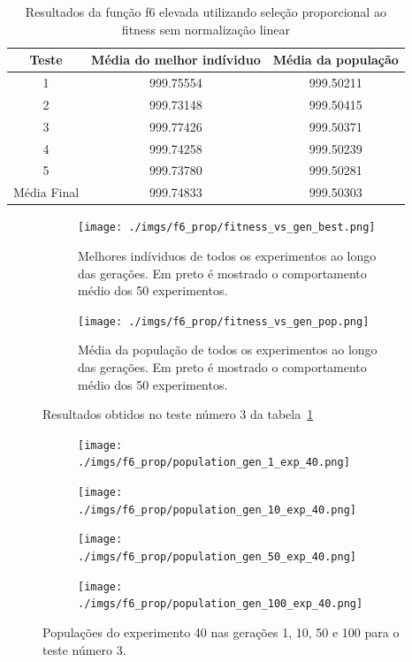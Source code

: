 \documentclass[12pt]{article}
\begin{document}
\begin{table}[htb]
	\centering
	\begin{tabular}{|c|c|c|}
		\hline
		\rowcolor[HTML]{9B9B9B}
		Teste & Média do melhor indíviduo & Média da população \\\hline
		1 & 999.75554 & 999.50211 \\\hline
		2 & 999.73148 & 999.50415 \\\hline
		3 & 999.77426 & 999.50371 \\\hline
		4 & 999.74258 & 999.50239 \\\hline
		5 & 999.73780 & 999.50281 \\\hline
		Média Final & 999.74833 & 999.50303 \\\hline
	\end{tabular}
	\caption{Resultados da função f6 elevada utilizando seleção
	proporcional ao fitness sem normalização linear \label{tab:f6_prop}}
\end{table}

\begin{figure}[htb]
	\begin{subfigure}{.45\textwidth}
		\centering
		\texttt{[image: ./imgs/f6\_prop/fitness\_vs\_gen\_best.png]}
		\caption{Melhores indíviduos de todos os experimentos ao longo das gerações.
		Em preto é mostrado o comportamento médio dos 50 experimentos. }
	\end{subfigure}
	\hfill
	\begin{subfigure}{.45\textwidth}
		\centering
		\texttt{[image: ./imgs/f6\_prop/fitness\_vs\_gen\_pop.png]}
		\caption{Média da população de todos os experimentos ao longo das gerações.
		Em preto é mostrado o comportamento médio dos 50 experimentos.}
	\end{subfigure}
	\caption{Resultados obtidos no teste número 3 da tabela~\ref{tab:f6_prop}}
\end{figure}


	\begin{figure}[htb]
	\begin{subfigure}{.5\textwidth}
		\centering
		\texttt{[image: ./imgs/f6\_prop/population\_gen\_1\_exp\_40.png]}
	  \end{subfigure}
	  \begin{subfigure}{.5\textwidth}
		\centering
		\texttt{[image: ./imgs/f6\_prop/population\_gen\_10\_exp\_40.png]}
	  \end{subfigure}
	  \begin{subfigure}{.5\textwidth}
		\centering
		\texttt{[image: ./imgs/f6\_prop/population\_gen\_50\_exp\_40.png]}
	  \end{subfigure}
	  \begin{subfigure}{.5\textwidth}
		\centering
		\texttt{[image: ./imgs/f6\_prop/population\_gen\_100\_exp\_40.png]}
	  \end{subfigure}
	\caption{Populações do experimento 40 nas gerações 1, 10, 50 e 100 para o teste número 3.}
	\end{figure}
\end{document}
